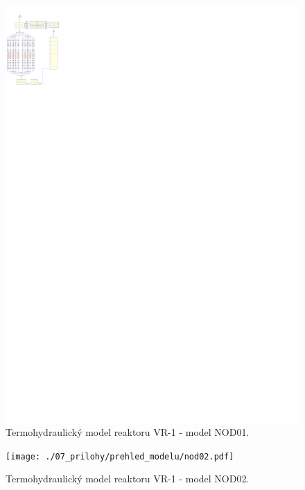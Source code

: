 \begin{figure}
	\centering
	\includegraphics[width=\textwidth, trim={0cm 218cm 148cm 5cm}, clip]{./07_prilohy/prehled_modelu/nod01.pdf}
	\caption{Termohydraulický model reaktoru VR-1 - model NOD01.}
	\label{fig:nod_01_prilohy}
\end{figure}
\begin{figure}
	\centering
	\texttt{[image: ./07\_prilohy/prehled\_modelu/nod02.pdf]}
	\caption{Termohydraulický model reaktoru VR-1 - model NOD02.}
	\label{fig:nod_02_prilohy}
\end{figure}
